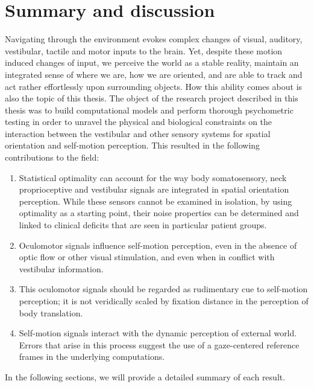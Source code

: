 \chapter{Summary and discussion}

Navigating through the environment evokes complex changes of visual, auditory, vestibular, tactile and
motor inputs to the brain. Yet, despite these motion induced changes of input, we perceive the world as a stable reality, maintain an integrated sense of where we are, how we are oriented, and are able to track and act rather effortlessly upon surrounding objects. How this ability comes about is also the topic of this thesis. The object of the research project described in this thesis was to build computational models and perform thorough psychometric testing in order to unravel the physical and biological constraints on the interaction between the vestibular and other sensory systems for spatial orientation and self-motion perception. This resulted in the following contributions to the field:

\begin{enumerate}
\item Statistical optimality can account for the way body somatosensory, neck proprioceptive and vestibular signals are integrated in spatial orientation perception. While these sensors cannot be examined in isolation, by using optimality as a starting point, their noise properties can be determined and linked to clinical deficits that are seen in particular patient groups.
\item Oculomotor signals influence self-motion perception, even in the absence of optic flow or other visual stimulation, and even when in conflict with vestibular information. 
\item This oculomotor signals should be regarded as rudimentary cue to self-motion perception; it is not veridically scaled by fixation distance in the perception of body translation. 
\item Self-motion signals interact with the dynamic perception of external world.  Errors that arise in this process suggest the use of a gaze-centered reference frames in the underlying computations. 
\end{enumerate}

In the following sections, we will provide a detailed summary of each result. 

